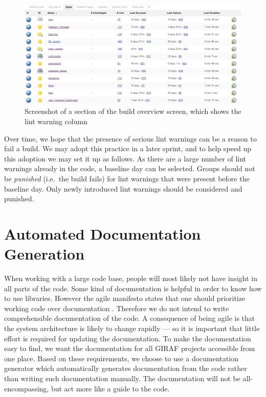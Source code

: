 \begin{figure}[tbp]
    \includegraphics[width=\textwidth]{graphics/jenkins-overview.pdf}
    \caption{Screenshot of a section of the build overview screen, which shows the lint warning column}
    \label{fig:jenkins-overview}
\end{figure}

Over time, we hope that the presence of serious lint warnings can be a reason to fail a build. We may adopt this practice in a later sprint, and to help speed up this adoption we may set it up as follows. As there are a large number of lint warnings already in the code, a baseline day can be selected. Groups should not be \emph{punished} (i.e.\ the build fails) for lint warnings that were present before the baseline day. Only newly introduced lint warnings should be considered and punished.

\section{Automated Documentation Generation}\label{sec:automated_documentation_gen}
When working with a large code base, people will most likely not have insight in all parts of the code. Some kind of documentation is helpful in order to know how to use libraries. However the agile manifesto states that one should prioritize working code over documentation \parencite{agile-manifesto-web}. Therefore we do not intend to write comprehensible documentation of the code. A consequence of being agile is that the system architecture is likely to change rapidly --- so it is important that little effort is required for updating the documentation. To make the documentation easy to find, we want the documentation for all GIRAF projects accessible from one place. Based on these requirements, we choose to use a documentation generator which automatically generates documentation from the code rather than writing such documentation manually. The documentation will not be all-encompassing, but act more like a guide to the code.

